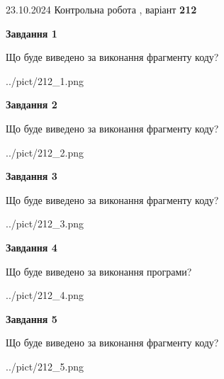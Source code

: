 \documentclass[12pt, ukrainian]{article}
\begin{document}
{\Large{23.10.2024 Контрольна робота , варіант  \No \textbf { 212 }\par}}
{
\begin {large}
{\begin {center}\textbf{Завдання 1}\end {center}}

Що буде виведено за виконання фрагменту коду?\par
\begin{center}
	{../pict/212_1.png}
\end{center}
\newpage

{\begin {center}\textbf{Завдання 2}\end {center}}

Що буде виведено за виконання фрагменту коду?\par
\begin{center}
	{../pict/212_2.png}
\end{center}
\newpage

{\begin {center}\textbf{Завдання 3}\end {center}}

Що буде виведено за виконання фрагменту коду?\par
\begin{center}
	{../pict/212_3.png}
\end{center}
\newpage

{\begin {center}\textbf{Завдання 4}\end {center}}

Що буде виведено за виконання програми?\par
\begin{center}
	{../pict/212_4.png}
\end{center}
\newpage

{\begin {center}\textbf{Завдання 5}\end {center}}

Що буде виведено за виконання фрагменту коду?\par
\begin{center}
	{../pict/212_5.png}
\end{center}
\newpage


\end{large}}
\end{document}
